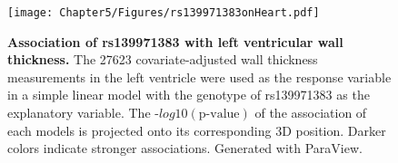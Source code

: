 \begin{figure}[hbtp]
	\centering
	\texttt{[image: Chapter5/Figures/rs139971383onHeart.pdf]}
	\caption[\textbf{Association of  rs139971383 with left ventricular wall thickness. }]{\textbf{Association of rs139971383 with left ventricular wall thickness. }The \num{27623} covariate-adjusted wall thickness measurements in the left ventricle were used as the response variable in a simple linear model with the genotype of rs139971383 as the explanatory variable. The -\(log10(\text{p-value})\) of the association of each models is projected onto its corresponding 3D position. Darker colors indicate stronger associations. Generated with ParaView. } 
	 	\label{fig:wall-heart}
\end{figure}


